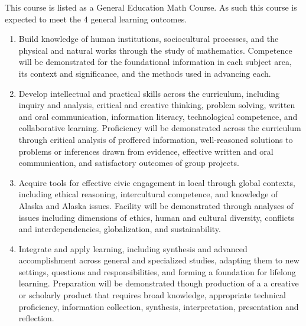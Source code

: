 \documentclass[12pt]{article}
\renewcommand{\emph}[1]{\textsf{\textbf{#1}}}
\newcommand{\localhead}[1]{\par\smallskip\textbf{#1}\nobreak\\}%
\def\subheading#1{\localhead{\emph{#1}}}
\begin{document}

This course is listed as a General Education Math Course. As such this course is expected to meet the 4 general learning outcomes. 

\begin{enumerate}
\item Build knowledge of human institutions, sociocultural processes, and the physical and natural works through the study of mathematics.  Competence will be demonstrated for the foundational information in each subject area, its context and significance, and the methods used in advancing each.

\item Develop intellectual and practical skills across the curriculum, including inquiry and analysis, critical and creative thinking, problem solving, written and oral communication, information literacy, technological competence, and collaborative learning. Proficiency will be demonstrated across the curriculum through critical analysis of proffered information, well-reasoned solutions to problems or inferences drawn from evidence, effective written and oral communication, and satisfactory outcomes of group projects.

\item Acquire tools for effective civic engagement in local through global contexts, including ethical reasoning, intercultural competence, and knowledge of Alaska and Alaska issues.  Facility will be demonstrated through analyses of issues including dimensions of ethics, human and cultural diversity, conflicts and interdependencies, globalization, and sustainability.   

\item Integrate and apply learning, including synthesis and advanced accomplishment across general and specialized studies, adapting them to new settings, questions and responsibilities, and forming a foundation for lifelong learning. Preparation will be demonstrated though production of a a creative or scholarly product that requires broad knowledge, appropriate technical proficiency, information collection, synthesis, interpretation, presentation and reflection.
\end{enumerate}
\end{document}
